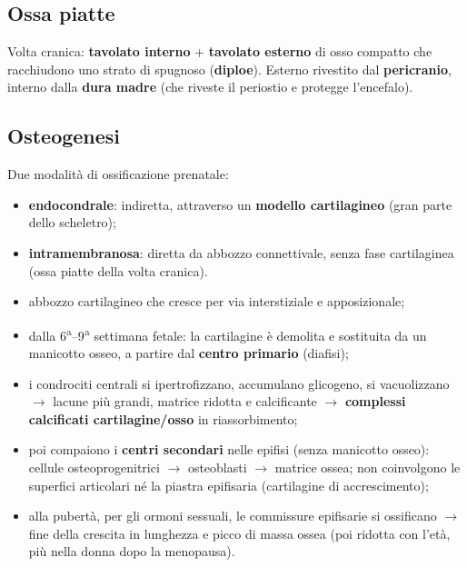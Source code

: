 \subsection{Ossa piatte}
Volta cranica: \textbf{tavolato interno} + \textbf{tavolato esterno} di osso compatto che
racchiudono uno strato di spugnoso (\textbf{diploe}). Esterno rivestito dal \textbf{pericranio},
interno dalla \textbf{dura madre} (che riveste il periostio e protegge l'encefalo).

\subsection{Osteogenesi}
Due modalità di ossificazione prenatale:
\begin{itemize}
  \item \textbf{endocondrale}: indiretta, attraverso un \textbf{modello cartilagineo} (gran parte
    dello scheletro);
  \item \textbf{intramembranosa}: diretta da abbozzo connettivale, senza fase cartilaginea (ossa
    piatte della volta cranica).
\end{itemize}

\begin{itemize}
  \item abbozzo cartilagineo che cresce per via interstiziale e apposizionale;
  \item dalla 6\textsuperscript{a}--9\textsuperscript{a} settimana fetale: la cartilagine è demolita
    e sostituita da un manicotto osseo, a partire dal \textbf{centro primario} (diafisi);
  \item i condrociti centrali si ipertrofizzano, accumulano glicogeno, si vacuolizzano $\rightarrow$
    lacune più grandi, matrice ridotta e calcificante $\rightarrow$ \textbf{complessi calcificati
    cartilagine/osso} in riassorbimento;
  \item poi compaiono i \textbf{centri secondari} nelle epifisi (senza manicotto osseo): cellule
    osteoprogenitrici $\rightarrow$ osteoblasti $\rightarrow$ matrice ossea; non coinvolgono le
    superfici articolari né la piastra epifisaria (cartilagine di accrescimento);
  \item alla pubertà, per gli ormoni sessuali, le commissure epifisarie si ossificano $\rightarrow$
    fine della crescita in lunghezza e picco di massa ossea (poi ridotta con l'età, più nella donna
    dopo la menopausa).
\end{itemize}

